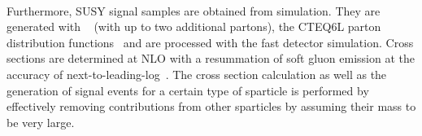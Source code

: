 \\
Furthermore, SUSY signal samples are obtained from simulation. They are generated with \madgraph~\cite{Alwall:2014hca} (with up to two additional partons), the CTEQ6L parton distribution functions~\cite{Pumplin:2002vw} and are processed with the fast detector simulation. Cross sections are determined at NLO with a resummation of soft gluon emission at the accuracy of next-to-leading-log~\cite{Beenakker:1996ch, PhysRevLett.102.111802, PhysRevD.80.095004, Beenakker:2009ha, Beenakker:2011fu, Kramer:2012bx}. The cross section calculation as well as the generation of signal events for a certain type of sparticle is performed by effectively removing contributions from other sparticles by assuming their mass to be very large.


